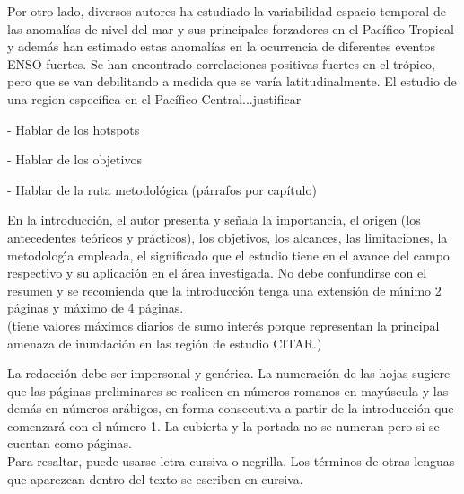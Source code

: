 Por otro lado, diversos autores ha estudiado la variabilidad espacio-temporal de las anomal\'{i}as de nivel del mar y sus principales forzadores en el Pac\'{i}fico Tropical y además han estimado estas anomal\'{i}as en la ocurrencia de diferentes eventos ENSO fuertes. Se han encontrado correlaciones positivas fuertes en el tr\'{o}pico, pero que se van debilitando a medida que se var\'{i}a latitudinalmente. El estudio de una region específica en el Pacífico Central...justificar

- Hablar de los hotspots

- Hablar de los objetivos

- Hablar de la ruta metodol\'{o}gica  (párrafos por capítulo)

En la introducci\'{o}n, el autor presenta y se\~{n}ala la importancia, el origen (los antecedentes te\'{o}ricos y pr\'{a}cticos), los objetivos, los alcances, las limitaciones, la metodolog\'{\i}a empleada, el significado que el estudio tiene en el avance del campo respectivo y su aplicaci\'{o}n en el \'{a}rea investigada. No debe confundirse con el resumen y se recomienda que la introducci\'{o}n tenga una extensi\'{o}n de m\'{\i}nimo 2 p\'{a}ginas y m\'{a}ximo de 4 p\'{a}ginas.\\


(tiene valores máximos diarios de sumo interés porque representan la principal amenaza de inundación en las región de estudio CITAR.)


La redacci\'{o}n debe ser impersonal y gen\'{e}rica. La numeraci\'{o}n de las hojas sugiere que las p\'{a}ginas preliminares se realicen en n\'{u}meros romanos en may\'{u}scula y las dem\'{a}s en n\'{u}meros ar\'{a}bigos, en forma consecutiva a partir de la introducci\'{o}n que comenzar\'{a} con el n\'{u}mero 1. La cubierta y la portada no se numeran pero si se cuentan como p\'{a}ginas.\\

Para resaltar, puede usarse letra cursiva o negrilla. Los t\'{e}rminos de otras lenguas que aparezcan dentro del texto se escriben en cursiva.\\